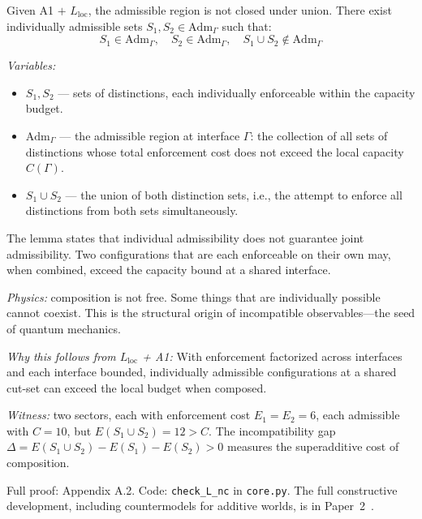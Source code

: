 \documentclass[11pt]{article}
\newcommand{\Adm}{\mathrm{Adm}}
\begin{document}
\begin{tcolorbox}[apfbox, title={Lemma $L_{\mathrm{nc}}$ (Non-Closure Under Composition)}]
Given A1 $+$ $L_{\mathrm{loc}}$, the admissible region is not closed under union.  There exist individually admissible sets $S_1, S_2 \in \Adm_\Gamma$ such that:
\begin{equation}
S_1 \in \Adm_\Gamma, \quad S_2 \in \Adm_\Gamma, \quad S_1 \cup S_2 \notin \Adm_\Gamma
\end{equation}

\smallskip\noindent\textit{Variables:}
\begin{itemize}[nosep,leftmargin=2em]
\item $S_1, S_2$ --- sets of distinctions, each individually enforceable within the capacity budget.
\item $\Adm_\Gamma$ --- the admissible region at interface $\Gamma$: the collection of all sets of distinctions whose total enforcement cost does not exceed the local capacity $C(\Gamma)$.
\item $S_1 \cup S_2$ --- the union of both distinction sets, i.e., the attempt to enforce all distinctions from both sets simultaneously.
\end{itemize}

\smallskip\noindent
The lemma states that individual admissibility does not guarantee joint admissibility.  Two configurations that are each enforceable on their own may, when combined, exceed the capacity bound at a shared interface.
\end{tcolorbox}

\textit{Physics:} composition is not free.  Some things that are individually possible cannot coexist.  This is the structural origin of incompatible observables---the seed of quantum mechanics.

\textit{Why this follows from $L_{\mathrm{loc}}$ + A1:} With enforcement factorized across interfaces and each interface bounded, individually admissible configurations at a shared cut-set can exceed the local budget when composed.

\textit{Witness:} two sectors, each with enforcement cost $E_1 = E_2 = 6$, each admissible with $C=10$, but $E(S_1 \cup S_2) = 12 > C$.  The incompatibility gap $\Delta = E(S_1 \cup S_2) - E(S_1) - E(S_2) > 0$ measures the superadditive cost of composition.

Full proof: Appendix A.2.  Code: \texttt{check\_L\_nc} in \texttt{core.py}.  The full constructive development, including countermodels for additive worlds, is in Paper~2~\cite{P2}.
\end{document}

